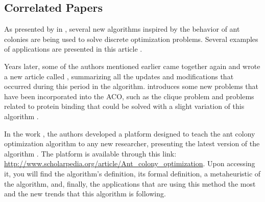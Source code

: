 \subsection{Correlated Papers}

As presented by \citeauthor{ACO_New_Algorithm} in , several
new algorithms inspired by the behavior of ant colonies are being used
to solve discrete optimization problems. Several
examples of applications are presented in this article \cite{ACO_New_Algorithm}.

Years later, some of the authors mentioned earlier came together again and
wrote a new article called , summarizing all the updates
and modifications that occurred during this period in the algorithm. \citeauthor{UpdatesInACO} introduces
some new problems that have been incorporated into the ACO, such as the clique problem and problems
related to protein binding that could be solved with a slight variation of this algorithm
\cite{UpdatesInACO}.

In the work , the authors \citeauthor{ACO_New_Algorithm_20anos}
developed a platform designed to teach the ant colony optimization algorithm
to any new researcher, presenting the latest version of the algorithm \cite{ACO_New_Algorithm_20anos}.
The platform is available through this link: \url{http://www.scholarpedia.org/article/Ant_colony_optimization}.
Upon accessing it, you will find the algorithm's definition, its formal definition, a metaheuristic
of the algorithm, and, finally, the applications that are using this method the most and the new trends
that this algorithm is following.
